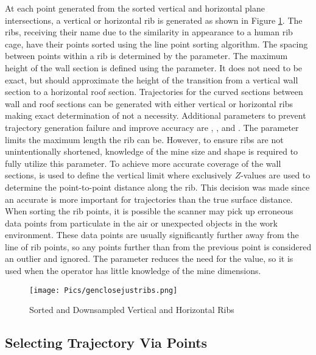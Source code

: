 At each point generated from the sorted vertical and horizontal plane intersections, a vertical or horizontal rib is generated as shown in Figure \ref{fig:ribs}. The ribs, receiving their name due to the similarity in appearance to a human rib cage, have their points sorted using the line point sorting algorithm. The spacing between points within a rib is determined by the  parameter. The maximum height of the wall section is defined using the  parameter. It does not need to be exact, but should approximate the height of the transition from a vertical wall section to a horizontal roof section. Trajectories for the curved sections between wall and roof sections can be generated with either vertical or horizontal ribs making exact determination of  not a necessity. Additional parameters to prevent trajectory generation failure and improve accuracy are , , and . The parameter  limits the maximum length the rib can be. However, to ensure ribs are not unintentionally shortened, knowledge of the mine size and shape is required to fully utilize this parameter. To achieve more accurate coverage of the wall sections,  is used to define the vertical limit where exclusively $Z$-values are used to determine the point-to-point distance along the rib. This decision was made since an accurate  is more important for trajectories than the true surface distance. When sorting the rib points, it is possible the scanner may pick up erroneous data points from particulate in the air or unexpected objects in the work environment. These data points are usually significantly further away from the line of rib points, so any points further than  from the previous point is considered an outlier and ignored. The  parameter reduces the need for the  value, so it is used when the operator has little knowledge of the mine dimensions.\\

\begin{figure}[h]
    \centering
    \texttt{[image: Pics/genclosejustribs.png]}
    \caption{Sorted and Downsampled Vertical and Horizontal Ribs}
    \label{fig:ribs}
\end{figure}

\subsection{Selecting Trajectory Via Points}

